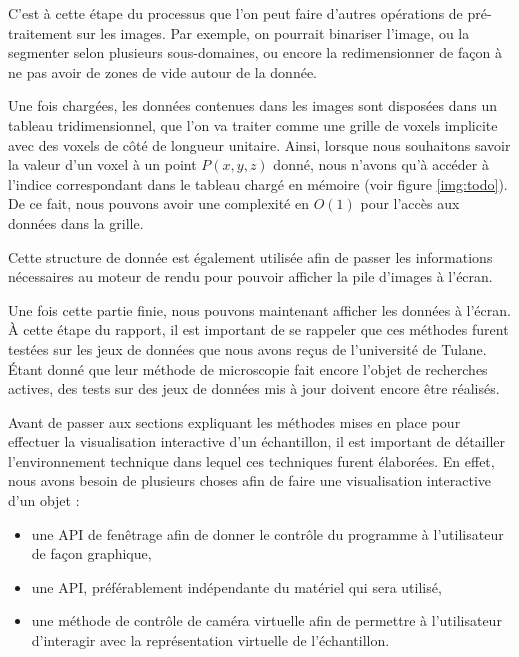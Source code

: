 {{{			C'est à cette étape du processus que l'on peut faire d'autres opérations de pré-traitement sur les images. Par exemple, on pourrait binariser l'image, ou la segmenter selon plusieurs sous-domaines, ou encore la redimensionner de façon à ne pas avoir de zones de vide autour de la donnée.

			Une fois chargées, les données contenues dans les images sont disposées dans un tableau tridimensionnel, que l'on va traiter comme une grille de voxels implicite avec des voxels de côté de longueur unitaire. Ainsi, lorsque nous souhaitons savoir la valeur d'un voxel à un point $P(x,y,z)$ donné, nous n'avons qu'à accéder à l'indice correspondant dans le tableau chargé en mémoire (voir figure \ref{img:todo}). De ce fait, nous pouvons avoir une complexité en $O(1)$ pour l'accès aux données dans la grille.\par

			\par

			Cette structure de donnée est également utilisée afin de passer les informations nécessaires au moteur de rendu pour pouvoir afficher la pile d'images à l'écran.\par
		 }
	}\vspace{30pt}\par

	Une fois cette partie finie, nous pouvons maintenant afficher les données à l'écran. \`A cette étape du rapport, il est important de se rappeler que ces méthodes furent testées sur les jeux de données que nous avons reçus de l'université de Tulane. Étant donné que leur méthode de microscopie fait encore l'objet de recherches actives, des tests sur des jeux de données mis à jour doivent encore être réalisés.\par

	Avant de passer aux sections expliquant les méthodes mises en place pour effectuer la visualisation interactive d'un échantillon, il est important de détailler l'environnement technique dans lequel ces techniques furent élaborées. En effet, nous avons besoin de plusieurs choses afin de faire une visualisation interactive d'un objet :\begin{itemize}
		\item une API de fenêtrage afin de donner le contrôle du programme à l'utilisateur de façon graphique,
		\item une API, préférablement indépendante du matériel qui sera utilisé,
		\item une méthode de contrôle de caméra virtuelle afin de permettre à l'utilisateur d'interagir avec la représentation virtuelle de l'échantillon.
	\end{itemize}\par

}
